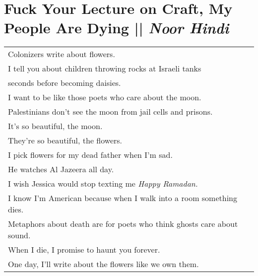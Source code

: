 \section[Fuck Your Lecture on Craft, My People Are Dying]{Fuck Your Lecture on Craft, My People Are Dying || \emph{Noor Hindi} \hspace*{\fill}  \thepage}
\label{sec:Fuck_Your_Lecture_on_Craft,_My_People_Are_Dying.tex}
\hspace{0pt}
\vfill
\begin{center}
\begin{tabular}{l}
Colonizers write about flowers.\\
I tell you about children throwing rocks at Israeli tanks\\
seconds before becoming daisies.\\
I want to be like those poets who care about the moon.\\
Palestinians don’t see the moon from jail cells and prisons.\\
It’s so beautiful, the moon.\\
They’re so beautiful, the flowers.\\
I pick flowers for my dead father when I’m sad.\\
He watches Al Jazeera all day.\\
I wish Jessica would stop texting me \emph{Happy Ramadan.}\\
I know I’m American because when I walk into a room something dies.\\
Metaphors about death are for poets who think ghosts care about sound.\\
When I die, I promise to haunt you forever.\\
One day, I’ll write about the flowers like we own them.\\
\end{tabular}
\end{center}
\vfill
\hspace{0pt}